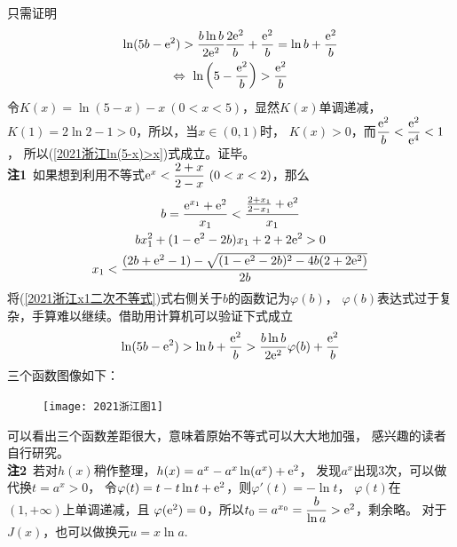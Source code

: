 \begin{enumerate}[label={【\textbf{例\thechapter.\arabic*}】},
 leftmargin=\inteval{\myenumleftmargin}pt,
 itemsep=\inteval{\myenumitempsep}pt,
 itemindent=\inteval{\myenumitemindent}pt]
只需证明
\begin{gather}
    \ln(5b-\e^2)>\dfrac{b\ln b}{2\e^{2}}\dfrac{2\e^2}{b}
    +\dfrac{\e^{2}}{b}=\ln b+\dfrac{\e^{2}}{b} \nonumber \\
    \Leftrightarrow\ 
    \ln\left(5-\dfrac{\e^{2}}{b}\right)>\dfrac{\e^{2}}{b}
    \label{2021浙江ln(5-x)>x}
\end{gather}
令$ K(x)=\ln(5-x)-x\ (0<x<5) $，显然$ K(x) $单调递减，
$ K(1)=2\ln 2-1>0 $，所以，当$ x\in(0,1) $时，
$ K(x)>0 $，而$ \dfrac{\mathrm{e}^{2}}{b}<\dfrac{\mathrm{e}^{2}}{\mathrm{e}^4}<1 $，
所以(\ref{2021浙江ln(5-x)>x})式成立。证毕。\\
\textbf{注1}\ 如果想到利用不等式$ \e^x<\dfrac{2+x}{2-x}\ (0<x<2) $，那么
\begin{gather}
    b=\dfrac{\mathrm{e}^{x_1}+\mathrm{e}^2}{x_1}<\dfrac{\frac{2+x_1}{2-x_1}+\mathrm{e}^2}{x_1}
    \nonumber \\
    bx_1^2+(1-\mathrm{e}^2-2b)x_1+2+2\mathrm{e}^2>0 \nonumber \\
    x_1<\dfrac{(2b+\mathrm{e}^2-1)-\sqrt{(1-\mathrm{e}^2-2b)^2-4b(2+2\mathrm{e}^2)}}{2b} 
    \label{2021浙江x1二次不等式}
\end{gather}
将(\ref{2021浙江x1二次不等式})式右侧关于$ b $的函数记为$ \varphi(b) $，
$ \varphi(b) $表达式过于复杂，手算难以继续。借助用计算机可以验证下式成立
\begin{gather*}
    \ln(5b-\mathrm{e}^2)>\ln b+\dfrac{\mathrm{e}^{2}}{b}
    >\dfrac{b\ln b}{2\mathrm{e}^{2}}\varphi(b)+\dfrac{\mathrm{e}^{2}}{b}
\end{gather*}
三个函数图像如下：
\begin{figure}[!ht]
    \centering
    \texttt{[image: 2021浙江图1]}
\end{figure}

可以看出三个函数差距很大，意味着原始不等式可以大大地加强，
感兴趣的读者自行研究。\\
\textbf{注2}\ 若对$ h(x) $稍作整理，$ h(x)=a^x-a^x\ln(a^x)+\mathrm{e}^2 $，
发现$ a^x $出现3次，可以做代换$ t=a^x>0 $，
令$ \varphi(t)=t-t\ln t+\mathrm{e}^2 $，则$ \varphi'(t)=-\ln t $，
$ \varphi(t) $在$ (1,+\infty) $上单调递减，且
$ \varphi(\mathrm{e}^2)=0 $，所以$ t_0=a^{x_0}=\dfrac{b}{\ln a}>\mathrm{e}^2 $，剩余略。
对于$ J(x) $，也可以做换元$ u=x\ln a $.


\end{enumerate}

